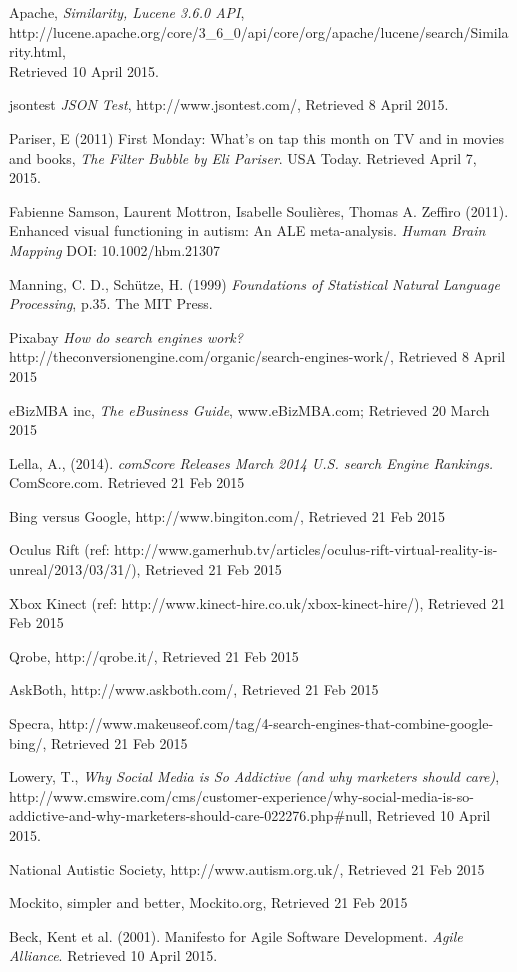 \documentclass[a4paper, 10pt]{article}
\begin{document}
\begin{thebibliography}{100}
 Apache, \textit{Similarity, Lucene 3.6.0 API},  \\http://lucene.apache.org/core/3\_6\_0/api/core/org/apache/lucene/search/Similarity.html, \\Retrieved 10 April 2015.

jsontest \textit{JSON Test}, http://www.jsontest.com/, Retrieved 8 April 2015.

 Pariser, E (2011) First Monday: What's on tap this month on TV and in movies and books, \textit{The Filter Bubble by Eli Pariser}. USA Today. Retrieved April 7, 2015. 

Fabienne Samson, Laurent Mottron, Isabelle Soulières, Thomas A. Zeffiro (2011). Enhanced visual functioning in autism: An ALE meta-analysis. \textit{Human Brain Mapping} DOI: 10.1002/hbm.21307

Manning, C. D., Schütze, H. (1999) \textit{Foundations of Statistical Natural Language Processing}, p.35. The MIT Press.

 Pixabay \textit{How do search engines work?} http://theconversionengine.com/organic/search-engines-work/, Retrieved 8 April 2015

eBizMBA inc, \textit{The eBusiness Guide}, www.eBizMBA.com; Retrieved 20 March 2015

Lella, A., (2014). \textit{comScore Releases March 2014 U.S. search Engine Rankings.} ComScore.com. Retrieved 21 Feb 2015

 Bing versus Google, http://www.bingiton.com/, Retrieved 21 Feb 2015 

 Oculus Rift (ref: http://www.gamerhub.tv/articles/oculus-rift-virtual-reality-is-unreal/2013/03/31/), Retrieved 21 Feb 2015 

 Xbox Kinect (ref: http://www.kinect-hire.co.uk/xbox-kinect-hire/), Retrieved 21 Feb 2015

 Qrobe, http://qrobe.it/, Retrieved 21 Feb 2015 

 AskBoth, http://www.askboth.com/, Retrieved 21 Feb 2015 

 Specra, http://www.makeuseof.com/tag/4-search-engines-that-combine-google-bing/, Retrieved 21 Feb 2015 

 Lowery, T., \textit{Why Social Media is So Addictive (and why marketers should care)}, http://www.cmswire.com/cms/customer-experience/why-social-media-is-so-addictive-and-why-marketers-should-care-022276.php\#null, Retrieved 10 April 2015.

 National Autistic Society, http://www.autism.org.uk/, Retrieved 21 Feb 2015

 Mockito, simpler and better, Mockito.org, Retrieved 21 Feb 2015

 Beck, Kent et al. (2001). Manifesto for Agile Software Development. \textit{Agile Alliance}. Retrieved 10 April 2015.

\end{thebibliography}
\end{document}
